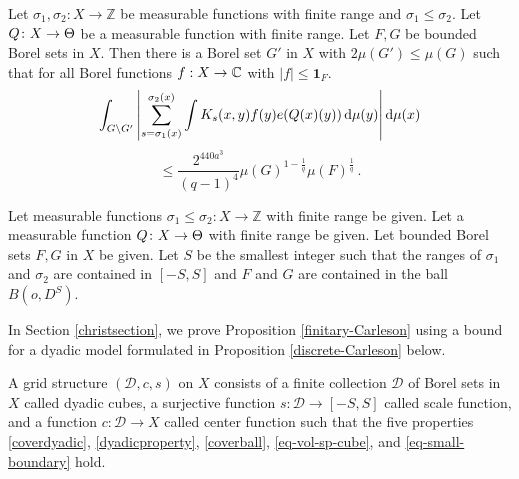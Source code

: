 \begin{proposition}
\label{finitary-Carleson}
Let ${\sigma_1},\sigma_2\colon X\to \mathbb{Z}$ be measurable functions with finite range and ${\sigma_1}\leq  \sigma_2$. Let ${Q}\colon X\to {\Theta}$ be a measurable function with finite range. Let $F,G$ be bounded Borel sets in $X$. Then there is a Borel set $G'$ in $X$ with $2\mu(G')\leq  \mu(G)$ such that
for all Borel functions $f:X\to {\mathbb{C}}$ with $|f|\le \mathbf{1}_F$.
\begin{equation*}
    \int_{G \setminus G'} \left|\sum_{s={\sigma_1}(x)}^{{\sigma_2}(x)} \int K_s(x,y) f(y) e({Q}(x)(y))  \, \mathrm{d}\mu(y) \right| \mathrm{d}\mu(x)
\end{equation*}
\begin{equation}
    \label{eq-linearized}
    \le \frac{2^{440a^3}}{(q-1)^4} \mu(G)^{1-\frac{1}{q}}
     \mu(F)^{\frac 1 q}\,.
\end{equation}
\end{proposition}
Let measurable functions ${\sigma_1}\leq \sigma_2\colon X\to \mathbb{Z}$ with finite range be given. Let a measurable function
${Q}\colon X\to {\Theta}$ with finite range
be given.
Let bounded Borel sets $F,G$ in $X$ be given.
Let $S$ be the smallest integer such that the ranges of
$\sigma_1$ and $\sigma_2$ are contained in $[-S,S]$ and $F$ and $G$ are contained
in the ball $B(o, D^S)$.


In Section \ref{christsection},
we prove Proposition \ref{finitary-Carleson}
 using  a
bound for a dyadic model formulated in Proposition
\ref{discrete-Carleson} below.

A grid structure $(\mathcal{D}, c, s)$ on $X$ consists of a finite collection $\mathcal{D}$  of Borel sets in $X$ called dyadic cubes, a surjective function  $s\colon \mathcal{D}\to [-S, S]$
called scale function,
and a function $c:\mathcal{D}\to X$
called center function such that the five properties
\eqref{coverdyadic},
\eqref{dyadicproperty}, \eqref{coverball},
\eqref{eq-vol-sp-cube}, and \eqref{eq-small-boundary}
hold.

